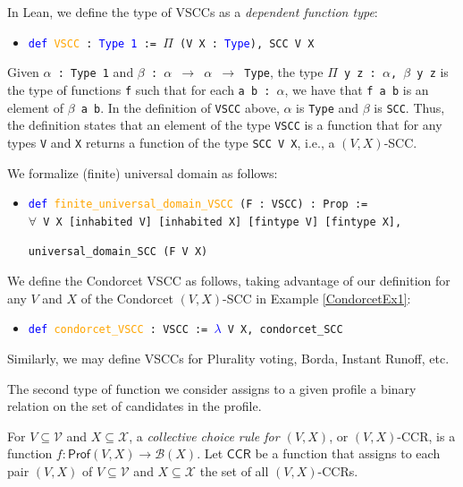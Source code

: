 \documentclass[runningheads]{llncs}
\begin{document}
In Lean, we define the type of VSCCs as a \textit{dependent function type}:
\begin{itemize}
\item[] \texttt{\textcolor{blue}{def} \textcolor{orange}{VSCC} : \textcolor{blue}{Type 1} := $\Pi$ (V X : \textcolor{blue}{Type}), SCC V X}
\end{itemize}
Given \texttt{$\alpha$ : Type 1} and \texttt{$\beta$ : $\alpha$ $\to$ $\alpha$ $\to$ Type}, the type \texttt{$\Pi$ y z : $\alpha$, $\beta$ y z} is the type of functions \texttt{f} such that for each \texttt{a b : $\alpha$}, we have that \texttt{f a b} is an element of \texttt{$\beta$~a~b}. In the definition of \texttt{VSCC} above, $\alpha$ is \texttt{Type} and $\beta$ is \texttt{SCC}.  Thus, the definition states that an element of the type \texttt{VSCC} is a function that for any types \texttt{V} and \texttt{X} returns a function of the type \texttt{SCC V X}, i.e., a $(V,X)$-SCC. 

We formalize (finite) universal domain as follows:
\begin{itemize}
\item[] \texttt{\textcolor{blue}{def} \textcolor{orange}{finite\_universal\_domain\_VSCC} (F : VSCC) : Prop :=}\\
    \texttt{$\forall$ V X [inhabited V] [inhabited X] [fintype V] [fintype X],}
    
    \texttt{universal\_domain\_SCC (F V X)}
\end{itemize}

\begin{example} We define the Condorcet VSCC as follows, taking advantage of our definition for any $V$ and $X$ of the Condorcet $(V,X)$-SCC in Example \ref{CondorcetEx1}:
\begin{itemize}
\item[] \texttt{\textcolor{blue}{def} \textcolor{orange}{condorcet\_VSCC} : VSCC := \textcolor{blue}{$\lambda$} V X, condorcet\_SCC}
\end{itemize}
\end{example}
Similarly, we may define VSCCs for Plurality voting, Borda, Instant Runoff, etc. 

The second type of function we consider assigns to a given profile a binary relation on the set of candidates in the profile.

\begin{definition}\textnormal{For $V\subseteq\mathcal{V}$ and $X\subseteq\mathcal{X}$, a \textit{collective choice rule for $(V,X)$}, or $(V,X)$-CCR, is a function  $f: \mathsf{Prof}(V,X)\to \mathcal{B}(X)$. Let $\mathsf{CCR}$ be a function that assigns to each pair $(V,X)$ of $V\subseteq\mathcal{V}$ and $X\subseteq\mathcal{X}$ the set of all $(V,X)$-CCRs.}\end{definition}
\end{document}
